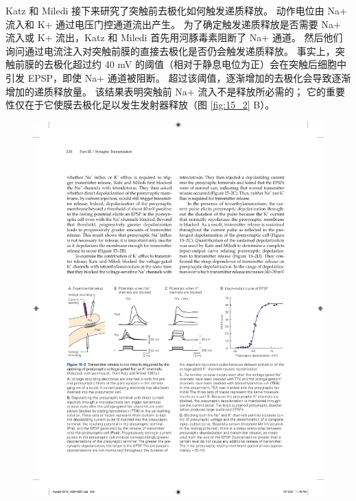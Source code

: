 Katz 和 Miledi 接下来研究了突触前去极化如何触发递质释放。
动作电位由 Na+ 流入和 K+ 通过电压门控通道流出产生。
为了确定触发递质释放是否需要 Na+ 流入或 K+ 流出，Katz 和 Miledi 首先用河豚毒素阻断了 Na+ 通道。
然后他们询问通过电流注入对突触前膜的直接去极化是否仍会触发递质释放。
事实上，突触前膜的去极化超过约 40 mV 的阈值（相对于静息电位为正）会在突触后细胞中引发 EPSP，即使 Na+ 通道被阻断。
超过该阈值，逐渐增加的去极化会导致逐渐增加的递质释放量。 
该结果表明突触前 Na+ 流入不是释放所必需的； 它的重要性仅在于它使膜去极化足以发生发射器释放（图 \ref{fig:15_2} B）。

\begin{figure}[htbp]
	\centering
	\includegraphics[width=0.95\linewidth]{chap15/fig_15_2}

\end{figure}
